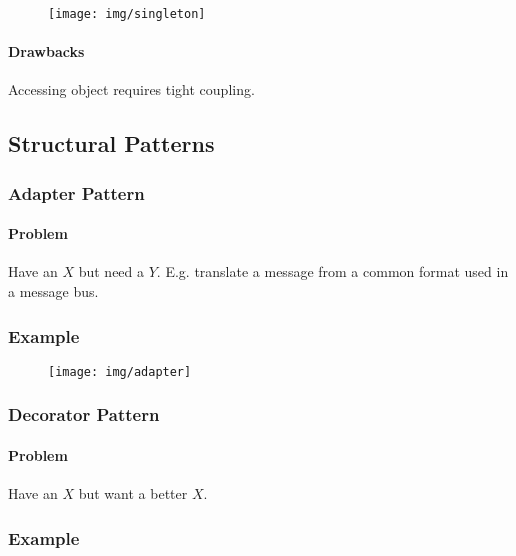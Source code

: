 \documentclass[twocolumn,english]{article}
\begin{document}
\begin{figure}[H]
\centering{}\texttt{[image: img/singleton]} 
\end{figure}



\paragraph{Drawbacks}

Accessing object requires tight coupling.


\subsection{Structural Patterns}


\subsubsection{Adapter Pattern}


\paragraph{Problem}

Have an $X$ but need a $Y$. E.g. translate a message from a common
format used in a message bus.


\subsubsection*{Example}

\begin{figure}[H]
\centering{}\texttt{[image: img/adapter]} 
\end{figure}



\subsubsection{Decorator Pattern}


\paragraph{Problem}

Have an $X$ but want a better $X$.


\subsubsection*{Example}
\end{document}
